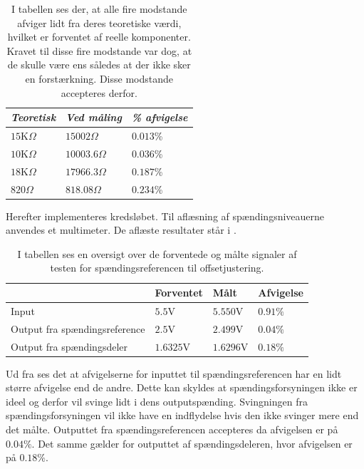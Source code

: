 \begin{table}[H]
	\centering
	\begin{tabular}{|l|l|l|}
		\hline
		\textit{Teoretisk} & \textit{Ved måling} & \textit{\% afvigelse} \\ \hline
		$15$K$\Omega$       & $15002\Omega$       & $0.013$\%               \\ \hline
		$10$K$\Omega$       & $10003.6\Omega$       & $0.036$\%               \\ \hline
		$18$K$\Omega$       & $17966.3 \Omega$       & $0.187$\%               \\ \hline
		$820 \Omega$       & $818.08 \Omega$       & $0.234$\%               \\ \hline
	\end{tabular}
	\caption{I tabellen ses der, at alle fire modstande afviger lidt fra deres teoretiske værdi, hvilket er forventet af reelle komponenter. Kravet til disse fire modstande var dog, at de skulle være ens således at der ikke sker en forstærkning. Disse modstande accepteres derfor.}
	\label{Tab:modstand_offset}
\end{table}

Herefter implementeres kredsløbet. Til aflæsning af spændingsniveauerne anvendes et multimeter. De aflæste resultater står i .
\begin{table}[]
\centering
\caption{I tabellen ses en oversigt over de forventede og målte signaler af testen for spændingsreferencen til offsetjustering.}
\label{Tab:SpaendingsRef_offset_test}
\begin{tabular}{|l|l|l|l|}
\hline
                              & Forventet & Målt      & Afvigelse \\ \hline
Input                         & $5.5$V    & $5.550$V  & $0.91 \%$ \\ \hline
Output fra spændingsreference & $2.5$V    & $2.499$V  & $0.04 \%$ \\ \hline
Output fra spændingsdeler     & $1.6325$V & $1.6296$V & $0.18 \%$ \\ \hline
\end{tabular}
\end{table}

Ud fra  ses det at afvigelserne for inputtet til spændingsreferencen har en lidt større afvigelse end de andre. Dette kan skyldes at spændingsforsyningen ikke er ideel og derfor vil svinge lidt i dens outputspænding. Svingningen fra spændingsforsyningen vil ikke have en indflydelse hvis den ikke svinger mere end det målte. Outputtet fra spændingsreferencen accepteres da afvigelsen er på $0.04 \%$. Det samme gælder for outputtet af spændingsdeleren, hvor afvigelsen er på $0.18 \%$. 